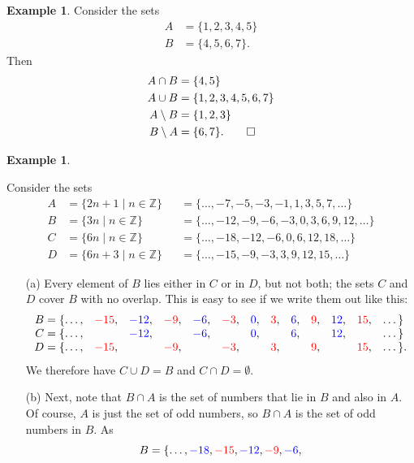 \documentclass[a4paper]{book}
\newcommand{\RED}[1]{{\color{red}#1}}
\newcommand{\BLUE}[1]{{\color{blue}#1}}
\newcommand{\Z}         {{\mathbb{Z}}}
\newcommand{\sm}        {\setminus}
\newcommand{\st}        {\;|\;}
\renewcommand{\:}{\colon}
\newcommand{\bilabel}[1]{\hypertarget{#1}{\label{#1}}}
\theoremstyle{definition}
\newtheorem{example}[theorem]{Example}
\begin{document}
\begin{example}
 Consider the sets
 \begin{align*}
  A &= \{ 1,2,3,4,5 \} \\
  B &= \{ 4,5,6,7 \}.
 \end{align*}
 Then
 \begin{align*}
  A\cap B &= \{4,5\} \\
  A\cup B &= \{1,2,3,4,5,6,7\} \\
  A\sm  B &= \{1,2,3\} \\
  B\sm  A &= \{6,7\}. \qed
 \end{align*}
\end{example}
\begin{example}\bilabel{eg-congruence}
 Consider the sets
 \begin{align*}
  A &= \{ 2n+1\st n\in\Z \} 
    &&= \{ \dotsc,-7,-5,-3,-1,1,3,5,7,\dotsc\} \\
  B &= \{3n\st n\in\Z\} 
    &&= \{ \dotsc,-12,-9,-6,-3,0,3,6,9,12,\dotsc\} \\
  C &= \{6n\st n\in\Z\} 
    &&= \{ \dotsc,-18,-12,-6,0,6,12,18,\dotsc\} \\
  D &= \{6n+3\st n\in\Z\} 
    &&= \{ \dotsc,-15,-9,-3,3,9,12,15,\dotsc\}
 \end{align*}
 \begin{itemize}
  \item[(a)] Every element of $B$ lies either in $C$ or in $D$, but
   not both; the sets $C$ and $D$ cover $B$ with no overlap.  This is
   easy to see if we write them out like this:
   {\small \[ \begin{array}{rcccccccccccl}
       B=\{ \dotsc,& \RED{-15}, & \BLUE{-12}, & \RED{-9}, & \BLUE{-6},
                   & \RED{-3},  & \BLUE{0},   & \RED{3},  & \BLUE{6},
                   & \RED{9},   & \BLUE{12},  & \RED{15}, & \dotsc\} \\
       C=\{ \dotsc,&& \BLUE{-12}, && \BLUE{-6}, && \BLUE{0}, && \BLUE{6},
                   && \BLUE{12},&& \dotsc\} \\
       D=\{ \dotsc,& \RED{-15}, && \RED{-9}, && \RED{-3}, && \RED{3},
                   && \RED{9}, && \RED{15}, & \dotsc\}.
   \end{array} \]}
   We therefore have $C\cup D=B$ and $C\cap D=\emptyset$.
  \item[(b)] Next, note that $B\cap A$ is the set of numbers that lie
   in $B$ and also in $A$.  Of course, $A$ is just the set of odd
   numbers, so $B\cap A$ is the set of odd numbers in $B$.  As
   \[ B = \{\dotsc,\BLUE{-18},\RED{-15},\BLUE{-12},\RED{-9},\BLUE{-6},
\]
\end{itemize}
\end{example}
\end{document}
